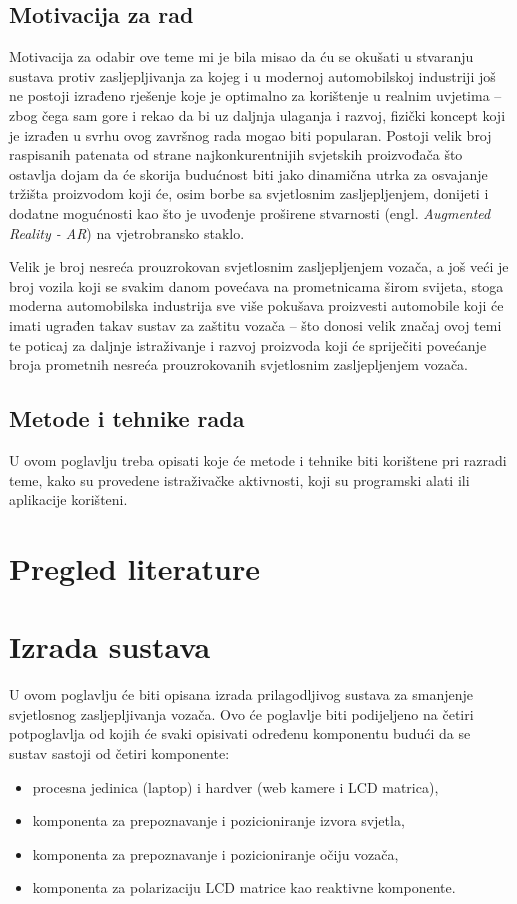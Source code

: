 \documentclass{foi}
\begin{document}
\section{Motivacija za rad}

Motivacija za odabir ove teme mi je bila misao da ću se okušati u stvaranju sustava protiv zasljepljivanja za kojeg i u modernoj automobilskoj industriji još ne postoji izrađeno rješenje koje je optimalno za korištenje u realnim uvjetima – zbog čega sam gore i rekao da bi uz daljnja ulaganja i razvoj,  fizički koncept koji je izrađen u svrhu ovog završnog rada mogao biti popularan. Postoji velik broj raspisanih patenata od strane najkonkurentnijih svjetskih proizvođača što ostavlja dojam da će skorija budućnost biti jako dinamična utrka za osvajanje tržišta proizvodom koji će, osim borbe sa svjetlosnim zasljepljenjem, donijeti i dodatne mogućnosti kao što je uvođenje proširene stvarnosti (engl. \emph{Augmented Reality - AR}) na vjetrobransko staklo.

Velik je broj nesreća prouzrokovan svjetlosnim zasljepljenjem vozača, a još veći je broj vozila koji se svakim danom povećava na prometnicama širom svijeta, stoga moderna automobilska industrija sve više pokušava proizvesti automobile koji će imati ugrađen takav sustav za zaštitu vozača – što donosi velik značaj ovoj temi te poticaj za daljnje istraživanje i razvoj proizvoda koji će spriječiti povećanje broja prometnih nesreća prouzrokovanih svjetlosnim zasljepljenjem vozača.

\section{Metode i tehnike rada}

U ovom poglavlju treba opisati koje će metode i tehnike biti korištene pri razradi teme, kako su provedene istraživačke aktivnosti, koji su programski alati ili aplikacije korišteni.

\chapter{Pregled literature}

\chapter{Izrada sustava}

U ovom poglavlju će biti opisana izrada prilagodljivog sustava za smanjenje svjetlosnog zasljepljivanja vozača. Ovo će poglavlje biti podijeljeno na četiri potpoglavlja od kojih će svaki opisivati određenu komponentu budući da se sustav sastoji od četiri komponente:
\begin{itemize}[noitemsep]
    \item procesna jedinica (laptop) i hardver (web kamere i LCD matrica),
    \item komponenta za prepoznavanje i pozicioniranje izvora svjetla,
    \item komponenta za prepoznavanje i pozicioniranje očiju vozača,
    \item komponenta za polarizaciju LCD matrice kao reaktivne komponente.
\end{itemize}
\end{document}

